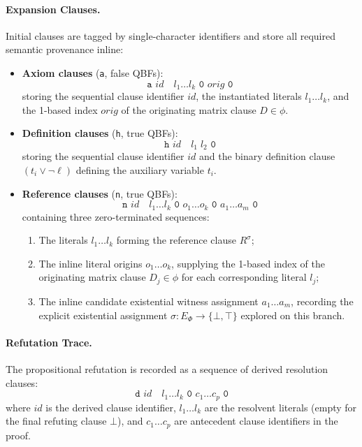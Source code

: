 \documentclass[runningheads]{llncs}
\newcommand{\Bool}{\{\bot,\top\}}
\begin{document}
\paragraph*{Expansion Clauses.}
Initial clauses are tagged by single-character identifiers and store all required semantic provenance inline:
\begin{itemize}
    \item \textbf{Axiom clauses} (\texttt{a}, false QBFs):
          \begin{equation*}
              \texttt{a } \mathit{id} \quad l_1 \dots l_k \texttt{ 0 } \mathit{orig} \texttt{ 0}
          \end{equation*}
          storing the sequential clause identifier $\mathit{id}$, the instantiated literals $l_1 \dots l_k$, and the 1-based index $\mathit{orig}$ of the originating matrix clause $D \in \phi$.
    \item \textbf{Definition clauses} (\texttt{h}, true QBFs):
          \begin{equation*}
              \texttt{h } \mathit{id} \quad l_1 \; l_2 \texttt{ 0}
          \end{equation*}
          storing the sequential clause identifier $\mathit{id}$ and the binary definition clause $(t_i \lor \neg\ell)$ defining the auxiliary variable $t_i$.
    \item \textbf{Reference clauses} (\texttt{n}, true QBFs):
          \begin{equation*}
              \texttt{n } \mathit{id} \quad l_1 \dots l_k \texttt{ 0 } o_1 \dots o_k \texttt{ 0 } a_1 \dots a_m \texttt{ 0}
          \end{equation*}
          containing three zero-terminated sequences:
          \begin{enumerate}
              \item The literals $l_1 \dots l_k$ forming the reference clause $R^\sigma$;
              \item The inline literal origins $o_1 \dots o_k$, supplying the 1-based index of the originating matrix clause $D_j \in \phi$ for each corresponding literal $l_j$;
              \item The inline candidate existential witness assignment $a_1 \dots a_m$, recording the explicit existential assignment $\sigma : E_\Phi \to \Bool$ explored on this branch.
          \end{enumerate}
\end{itemize}

\paragraph*{Refutation Trace.}
The propositional refutation is recorded as a sequence of derived resolution clauses:
\begin{equation*}
    \texttt{d } \mathit{id} \quad l_1 \dots l_k \texttt{ 0 } c_1 \dots c_p \texttt{ 0}
\end{equation*}
where $\mathit{id}$ is the derived clause identifier, $l_1 \dots l_k$ are the resolvent literals (empty for the final refuting clause $\bot$), and $c_1 \dots c_p$ are antecedent clause identifiers in the proof.
\end{document}
